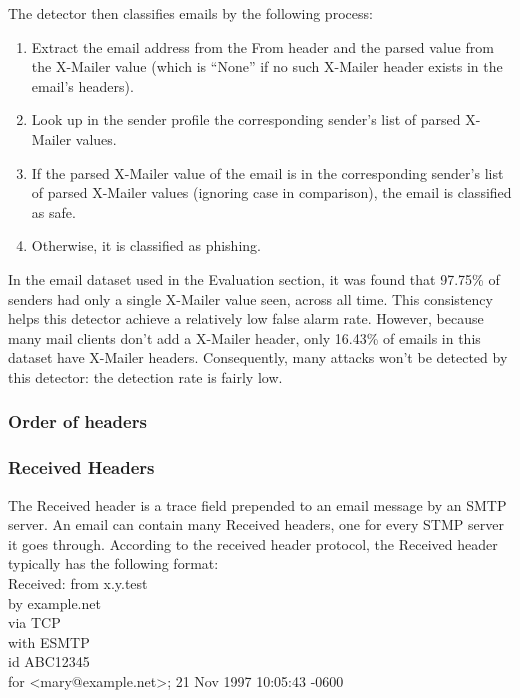 \documentclass[letterpaper]{article}
\newcommand\tab[1][1cm]{\hspace*{#1}}
\begin{document}
The detector then classifies emails by the following process:

\begin{enumerate}
\item Extract the email address from the From header and the parsed value from the X-Mailer value (which is ``None'' if no such X-Mailer header exists in the email's headers).
\item Look up in the sender profile the corresponding sender's list of parsed X-Mailer values.
\item If the parsed X-Mailer value of the email is in the corresponding sender's list of parsed X-Mailer values (ignoring case in comparison), the email is classified as safe.
\item Otherwise, it is classified as phishing.
\end{enumerate}

In the email dataset used in the Evaluation section, it was found that
97.75\% of senders had only a single X-Mailer value seen, across all time.
This consistency helps this detector achieve a relatively low false alarm
rate.
However, because many mail clients don't add a X-Mailer header,
only 16.43\% of emails in this dataset have X-Mailer headers.
Consequently, many attacks won't be detected by this detector:
the detection rate is fairly low.

\subsubsection{Order of headers}

\subsubsection{Received Headers}
The Received header is a trace field prepended to an email message by an SMTP server. An email can contain many Received headers, one for every STMP server it goes through. According to the received header protocol, the Received header typically has the following format:\\

Received: from x.y.test\\
\tab by example.net\\
\tab via TCP\\
\tab with ESMTP\\
\tab id ABC12345\\
\tab for <mary@example.net>;  21 Nov 1997 10:05:43 -0600\\
\end{document}
